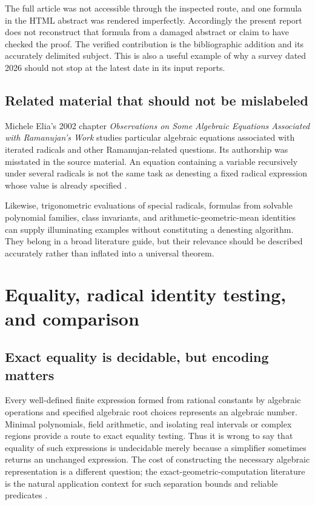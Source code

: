 \documentclass[11pt,oneside]{article}
\numberwithin{equation}{section}
\theoremstyle{definition}
\theoremstyle{remark}
\begin{document}
The full article was not accessible through the inspected route, and one formula in the HTML abstract was rendered imperfectly. Accordingly the present report does not reconstruct that formula from a damaged abstract or claim to have checked the proof. The verified contribution is the bibliographic addition and its accurately delimited subject. This is also a useful example of why a survey dated 2026 should not stop at the latest date in its input reports.

\subsection{Related material that should not be mislabeled}
Michele Elia's 2002 chapter \emph{Observations on Some Algebraic Equations Associated with Ramanujan's Work} studies particular algebraic equations associated with iterated radicals and other Ramanujan-related questions. Its authorship was misstated in the source material. An equation containing a variable recursively under several radicals is not the same task as denesting a fixed radical expression whose value is already specified \cite{elia}.

Likewise, trigonometric evaluations of special radicals, formulas from solvable polynomial families, class invariants, and arithmetic-geometric-mean identities can supply illuminating examples without constituting a denesting algorithm. They belong in a broad literature guide, but their relevance should be described accurately rather than inflated into a universal theorem.

\section{Equality, radical identity testing, and comparison}\label{sec:complexity}

\subsection{Exact equality is decidable, but encoding matters}
Every well-defined finite expression formed from rational constants by algebraic operations and specified algebraic root choices represents an algebraic number. Minimal polynomials, field arithmetic, and isolating real intervals or complex regions provide a route to exact equality testing. Thus it is wrong to say that equality of such expressions is undecidable merely because a simplifier sometimes returns an unchanged expression. The cost of constructing the necessary algebraic representation is a different question; the exact-geometric-computation literature is the natural application context for such separation bounds and reliable predicates \cite{cohen,sage,pari,flint,exactgeometry}.
\end{document}
